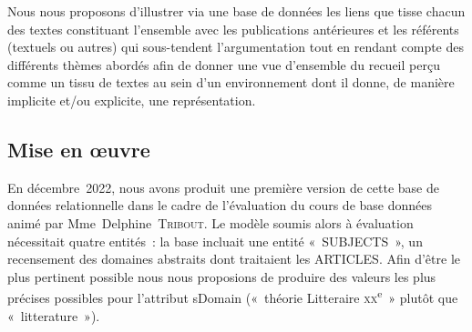 \documentclass[12pt, a4paper]{article}
\begin{document}
    Nous nous proposons d'illustrer via une base de données les liens que tisse chacun des textes constituant l'ensemble avec les publications antérieures et les référents (textuels ou autres) qui sous-tendent l'argumentation tout en rendant compte des différents thèmes abordés afin de donner une vue d'ensemble du recueil perçu comme un tissu de textes au sein d'un environnement dont il donne, de manière implicite et/ou explicite, une représentation.


   




    \subsection{Mise en œuvre}

    En décembre~2022, nous avons produit une première version de cette base de données relationnelle dans le cadre de l'évaluation du cours de base données animé par Mme~Delphine~\textsc{Tribout}. Le modèle soumis alors à évaluation nécessitait quatre entités~: la base incluait une entité «~SUBJECTS~», un recensement des domaines abstraits dont traitaient les ARTICLES. Afin d'être le plus pertinent possible nous nous proposions de produire des valeurs les plus précises possibles pour l'attribut sDomain («~théorie Litteraire \textsc{xx}\textsuperscript{e}~» plutôt que «~litterature~»).
\end{document}
